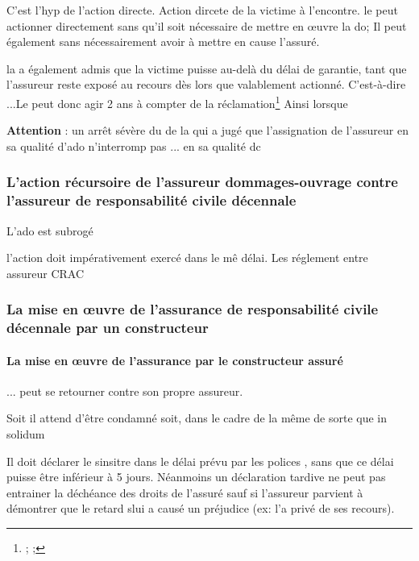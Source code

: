 			C'est l'hyp de l'action directe. Action dircete de la victime à l'encontre. le \Mo peut actionner directement sans qu'il soit nécessaire de mettre en œuvre la do; Il peut également sans nécessairement avoir à mettre en cause l'assuré. 

			 

			la \CourDeCas a également admis que la victime puisse au-delà du délai de garantie, tant que l'assureur reste exposé au recours dès lors que valablement actionné. C'est-à-dire ...Le \Mo peut donc agir  2 ans à compter de la réclamation\footnote{ ;  ; } Ainsi lorsque

			\textbf{Attention} : un arrêt sévère du  de la \CourDeCas \civTrois* qui a jugé que l'assignation de l'assureur en sa qualité d'ado n'interromp pas ... en sa qualité dc

		\subsubsection{L'action récursoire de l'assureur dommages-ouvrage contre l'assureur de responsabilité civile décennale}

			L'ado est subrogé

			l'action doit impérativement exercé dans le mê délai. Les réglement entre assureur CRAC

		\subsubsection{La mise en œuvre de l'assurance de responsabilité civile décennale par un constructeur}

			\paragraph{La mise en œuvre de l'assurance par le constructeur assuré}

				... peut se retourner contre son propre assureur.

				Soit il attend d'être condamné soit, dans le cadre de la même de sorte que in solidum

				Il doit déclarer le sinsitre dans le délai prévu par les polices , sans que ce délai puisse être inférieur à 5 jours. Néanmoins un déclaration tardive ne peut pas entrainer la déchéance des droits de l'assuré sauf si l'assureur parvient à démontrer que le retard slui a causé un préjudice (ex: l'a privé de ses recours).

